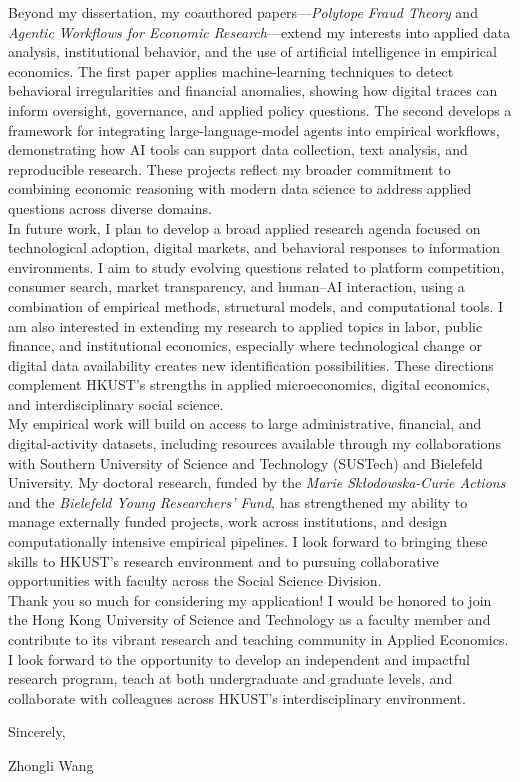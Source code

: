 \documentclass{nfr}
\begin{document}
Beyond my dissertation, my coauthored papers—\textit{Polytope Fraud Theory} and \textit{Agentic Workflows for Economic Research}—extend my interests into applied data analysis, institutional behavior, and the use of artificial intelligence in empirical economics. 
The first paper applies machine-learning techniques to detect behavioral irregularities and financial anomalies, showing how digital traces can inform oversight, governance, and applied policy questions. 
The second develops a framework for integrating large-language-model agents into empirical workflows, demonstrating how AI tools can support data collection, text analysis, and reproducible research. 
These projects reflect my broader commitment to combining economic reasoning with modern data science to address applied questions across diverse domains.\\

In future work, I plan to develop a broad applied research agenda focused on technological adoption, digital markets, and behavioral responses to information environments. 
I aim to study evolving questions related to platform competition, consumer search, market transparency, and human–AI interaction, using a combination of empirical methods, structural models, and computational tools. 
I am also interested in extending my research to applied topics in labor, public finance, and institutional economics, especially where technological change or digital data availability creates new identification possibilities. 
These directions complement HKUST’s strengths in applied microeconomics, digital economics, and interdisciplinary social science.\\

My empirical work will build on access to large administrative, financial, and digital-activity datasets, including resources available through my collaborations with Southern University of Science and Technology (SUSTech) and Bielefeld University. 
My doctoral research, funded by the \textit{Marie Skłodowska-Curie Actions} and the \textit{Bielefeld Young Researchers’ Fund}, has strengthened my ability to manage externally funded projects, work across institutions, and design computationally intensive empirical pipelines. 
I look forward to bringing these skills to HKUST’s research environment and to pursuing collaborative opportunities with faculty across the Social Science Division.\\

Thank you so much for considering my application! 
I would be honored to join the Hong Kong University of Science and Technology as a faculty member and contribute to its vibrant research and teaching community in Applied Economics. 
I look forward to the opportunity to develop an independent and impactful research program, teach at both undergraduate and graduate levels, and collaborate with colleagues across HKUST’s interdisciplinary environment.

\vspace{3mm}

\noindent Sincerely,\\
\vspace{10mm}

\noindent Zhongli Wang
\end{document}
